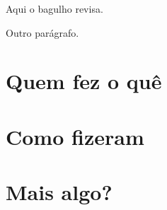 
Aqui o bagulho revisa.

Outro parágrafo.

\section{Quem fez o quê}
\section{Como fizeram}
\section{Mais algo?}